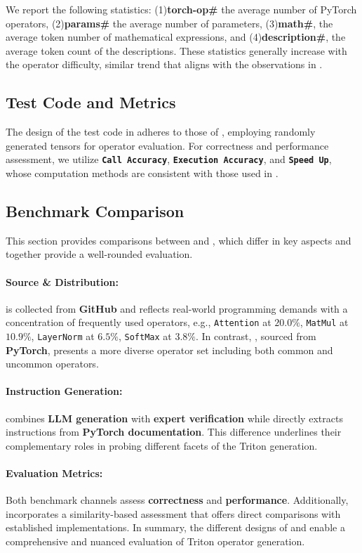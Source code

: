 We report the following statistics: (1)\textbf{torch-op\#} the average number of PyTorch operators, (2)\textbf{params\#} the average number of parameters, (3)\textbf{math\#}, the average token number of mathematical expressions, and (4)\textbf{description\#}, the average token count of the descriptions. 
These statistics generally increase with the operator difficulty, similar trend that aligns with the observations in \benchone. 




\subsection{Test Code and Metrics}
\label{sec:benchtwo-testandmetric}
The design of the test code in \benchtwo adheres to those of \benchone, employing randomly generated tensors for operator evaluation.
For correctness and performance assessment, we utilize \textbf{\texttt{Call Accuracy}}, \textbf{\texttt{Execution Accuracy}}, and \textbf{\texttt{Speed Up}}, whose computation methods are consistent with those used in \benchone. 




\subsection{Benchmark Comparison} 
\label{sec:benchtwo-comparison}
This section provides comparisons between \benchone and \benchtwo, which differ in key aspects and together provide a well-rounded evaluation. 
\paragraph{Source \& Distribution:} \benchone is collected from \textbf{GitHub} and reflects real-world programming demands with a concentration of frequently used operators, e.g., \texttt{Attention} at $20.0\%$, \texttt{MatMul} at $10.9\%$, \texttt{LayerNorm} at $6.5\%$, \texttt{SoftMax} at $3.8\%$. In contrast, \benchtwo, sourced from \textbf{PyTorch}, presents a more diverse operator set including both common and uncommon operators.
% 
\paragraph{Instruction Generation:} \benchone combines \textbf{LLM generation} with \textbf{expert verification} while \benchtwo directly extracts instructions from \textbf{PyTorch documentation}. This difference underlines their complementary roles in probing different facets of the Triton generation. 
\paragraph{Evaluation Metrics:} Both benchmark channels assess \textbf{correctness} and \textbf{performance}. Additionally, \benchone incorporates a similarity-based assessment that offers direct comparisons with established implementations. 
In summary, the different designs of \benchone and \benchtwo enable a comprehensive and nuanced evaluation of Triton operator generation. 
